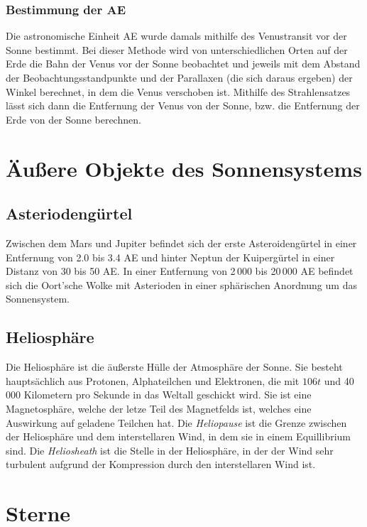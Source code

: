 \documentclass[a4paper,12pt]{article}
\begin{document}
\subsubsection{Bestimmung der AE}
Die astronomische Einheit AE wurde damals mithilfe des Venustransit vor der Sonne bestimmt. Bei dieser Methode wird von unterschiedlichen Orten auf der Erde die Bahn der Venus vor der Sonne beobachtet und jeweils mit dem Abstand der Beobachtungsstandpunkte und der Parallaxen (die sich daraus ergeben) der Winkel berechnet, in dem die Venus \glqq verschoben\grqq{} ist. Mithilfe des Strahlensatzes lässt sich dann die Entfernung der Venus von der Sonne, bzw. die Entfernung der Erde von der Sonne berechnen.

\section{Äußere Objekte des Sonnensystems}
\subsection{Asteriodengürtel}
Zwischen dem Mars und Jupiter befindet sich der erste Asteroidengürtel in einer Entfernung von 2.0 bis 3.4 AE und hinter Neptun der Kuipergürtel in einer Distanz von 30 bis 50 AE. In einer Entfernung von 2\,000 bis 20\,000 AE befindet sich die Oort'sche Wolke mit Asterioden in einer sphärischen Anordnung um das Sonnensystem.

\subsection{Heliosphäre}
Die Heliosphäre ist die äußerste Hülle der Atmosphäre der Sonne. Sie besteht hauptsächlich aus Protonen, Alphateilchen und Elektronen, die mit $106t$ und 40\,000 Kilometern pro Sekunde in das Weltall geschickt wird. Sie ist eine Magnetosphäre, welche der letze Teil des Magnetfelds ist, welches eine Auswirkung auf geladene Teilchen hat. Die \textit{Heliopause} ist die Grenze zwischen der Heliosphäre und dem interstellaren Wind, in dem sie in einem Equillibrium sind. Die \textit{Heliosheath} ist die Stelle in der Heliosphäre, in der der Wind sehr turbulent aufgrund der Kompression durch den interstellaren Wind ist.

\section{Sterne}
\end{document}
